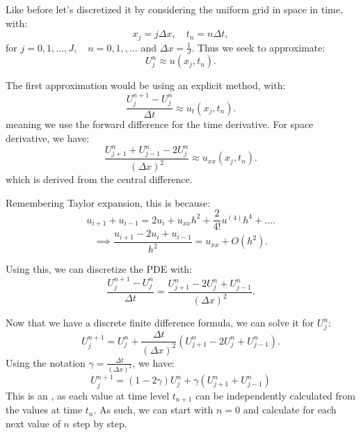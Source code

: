 \documentclass[../main/main.tex]{subfiles}
\begin{document}
Like before let's discretized it by considering the uniform grid in space in time, with: \[
x_j = j \Delta x, \quad t_n = n \Delta t
,\] for $j=0,1,\ldots,J, \quad n = 0,1,,\ldots$ and $\Delta x = \frac{1}{J}$. Thus we seek to approximate: \[
U_j^{n} \approx u(x_j, t_n)
.\] 

The first approximation would be using an explicit method, with: \[
    \frac{U_j^{n+1}-U_j^n}{\Delta t} \approx u_t(x_j,t_n)
.\] meaning we use the forward difference for the time derivative. For space derivative, we have: \[
\frac{U_{j+1}^{n}+U_{j-1}^{n}-2U_{j}^{n}}{(\Delta x)^2} \approx u_{x x } (x_j,t_n)
.\] which is derived from the central difference.
\begin{remark}
   Remembering Taylor expansion, this is because: \[
       u_{i+1} + u_{i-1} = 2u_i + u_{x x} h^2 + \frac{2}{4!} u^{(4)}h^{4} + \ldots
   .\]  \[
   \implies \frac{u_{i+1}-2u_i+u_{i-1}}{h^2} = u_{x x } + O(h^2)
   .\] 
\end{remark}

Using this, we can discretize the PDE with: \[
    \frac{U_j^{n+1}-U_j^{n}}{\Delta t} = \frac{U_{j+1}^{n}-2U_j^{n}+U_{j-1}^{n}}{(\Delta x)^2}
.\] 

Now that we have a discrete finite difference formula, we can solve it for $U_j^n$: \[
    U_j^{n+1} = U_j^n + \frac{\Delta t}{(\Delta x)^2} \left( U_{j+1}^{n}-2U_j^n + U^n_{j-1} \right) 
    .\] Using the notation $\gamma = \frac{\Delta t}{\left( \Delta x\right) ^2}$, we have: \begin{equation}
    \label{9_10_Ujn}
U^{n+1}_j = (1-2\gamma)U_j^n + \gamma \left( U_{j+1}^n + U_{j-1} ^n\right) 
\end{equation} This is an , as each value at time level $t_{n+1}$ can be independently calculated from the values at time $t_n$. As such, we can start with  $n=0$ and calculate for each next value of  $n$ step by step.
\end{document}
